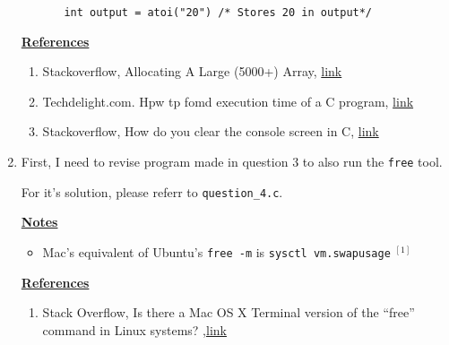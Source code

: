 \documentclass[12pt]{article}
\begin{document}
\begin{enumerate}[1.]
\begin{itemize}
\begin{itemize}
            \texttt{int output = atoi("20") /* Stores 20 in output*/}
        \end{itemize}
    \end{itemize}

    \bigskip

    \underline{\textbf{References}}

    \bigskip

    \begin{enumerate}[1)]
        \item Stackoverflow, Allocating A Large (5000+) Array, \href{https://stackoverflow.com/questions/5746377/allocating-a-large-5000-array}{link}
        \item Techdelight.com. Hpw tp fomd execution time of a C program, \href{https://www.techiedelight.com/find-execution-time-c-program/}{link}
        \item Stackoverflow, How do you clear the console screen in C, \href{https://stackoverflow.com/questions/2347770/how-do-you-clear-the-console-screen-in-c}{link}
    \end{enumerate}

    \item

    First, I need to revise program made in question 3 to also run the \texttt{free}
    tool.

    \bigskip

    For it's solution, please referr to \texttt{question\_4.c}.

    \bigskip

    \underline{\textbf{Notes}}

    \begin{itemize}
        \item Mac's equivalent of Ubuntu's \texttt{free -m} is \texttt{sysctl vm.swapusage} $^{[1]}$
    \end{itemize}

    \bigskip

    \underline{\textbf{References}}

    \begin{enumerate}[1)]
        \item Stack Overflow, Is there a Mac OS X Terminal version of the “free” command in Linux systems? ,\href{https://apple.stackexchange.com/questions/4286/is-there-a-mac-os-x-terminal-version-of-the-free-command-in-linux-systems/4296}{link}
    \end{enumerate}

\end{enumerate}
\end{document}
